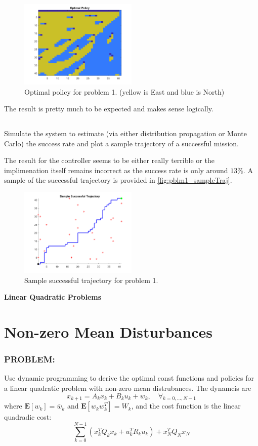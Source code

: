 \documentclass[]{article}
\newcommand{\Problem}{\subsubsection*{\textbf{PROBLEM:}}}
\begin{document}
\begin{figure}[h]
    \centering
    \includegraphics[width=0.5\textwidth]{figs/pblm1_optPolicy.png}
    \caption{Optimal policy for problem 1. (yellow is East and blue is North)}
    \label{fig:pblm1_optPolicy}
\end{figure}

The result is pretty much to be expected and makes sense logically.


\subsection{}
Simulate the system to estimate (via either distribution propagation or Monte Carlo) the success rate and plot a sample trajectory of a successful mission.


The result for the controller seems to be either really terrible or the implimenation itself remains incorrect as the success rate is only around $13\%$.
A sample of the successful trajectory is provided in \autoref{fig:pblm1_sampleTraj}.

\begin{figure}[h]
    \centering
    \includegraphics[width=0.5\textwidth]{figs/pblm1_sampleTraj.png}
    \caption{Sample successful trajectory for problem 1.}
    \label{fig:pblm1_sampleTraj}
\end{figure}

\newpage
\textbf{Linear Quadratic Problems}
\section{Non-zero Mean Disturbances}
\Problem
Use dynamic programming to derive the optimal const functions and policies for a linear quadratic problem with non-zero mean distrubances.
The dynamcis are \[
    x_{k+1} = A_k x_k + B_k u_k + w_k, \quad \forall_{k=0,\dots, N-1}
\] 
where $\mathbf{E} [w_k] = \bar{w}_k$ and $\mathbf{E}[w_k w_k^T] = W_k$, and the cost function is the linear quadradic cost: \[
    \sum_{k=0}^{N-1} (x_k^T Q_k x_k + u_k^T R_k u_k) + x_N^T Q_N x_N
\]
\end{document}

